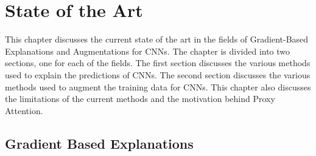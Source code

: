 \chapter{State of the Art} \label{ch:sota}
This chapter discusses the current state of the art in the fields of Gradient-Based Explanations and Augmentations for CNNs. The chapter is divided into two sections, one for each of the fields. The first section discusses the various methods used to explain the predictions of CNNs. The second section discusses the various methods used to augment the training data for CNNs. This chapter also discusses the limitations of the current methods and the motivation behind Proxy Attention.

\section{Gradient Based Explanations} \label{sec:gradient_based_explanations}
